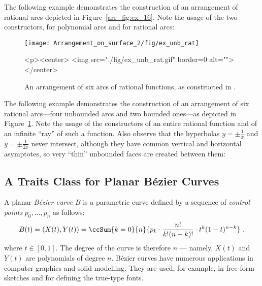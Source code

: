 The following example demonstrates the construction of an
arrangement of rational arcs depicted in
Figure~\ref{arr_fig:ex_16}. Note the usage of the two
constructors, for polynomial arcs and for rational arcs:

\pagebreak[3]


\begin{figure}[h]
\begin{ccTexOnly}
  \begin{center}
  \texttt{[image: Arrangement\_on\_surface\_2/fig/ex\_unb\_rat]}
  \end{center}
\end{ccTexOnly}
\begin{ccHtmlOnly}
  <p><center>
  <img src="./fig/ex_unb_rat.gif" border=0 alt="">
  </center>
\end{ccHtmlOnly}
\caption{An arrangement of six arcs of rational functions, as
constructed in
.\label{arr_fig:ex_unb_rat}}
\end{figure}

The following example demonstrates the construction of an
arrangement of six rational arcs---four unbounded arcs and two
bounded ones---as depicted in Figure~\ref{arr_fig:ex_unb_rat}. Note
the usage of the constructors of an entire rational function and of
an infinite ``ray'' of such a function. Also observe that the hyperbolas
$y = \pm\frac{1}{x}$ and $y = \pm\frac{1}{2x}$ never intersect, although
they have common vertical and horizontal asymptotes, so very ``thin''
unbounded faces are created between them:


\subsection{A Traits Class for Planar B\'ezier Curves\label{arr_ssec:tr_bez}}

A planar {\em B\'ezier curve} $B$ is a parametric curve defined by a sequence
of {\em control points} $p_0, \ldots, p_n$ as follows:
\begin{eqnarray*}
B(t) = \left(X(t), Y(t)\right)
  = \ccSum{k=0}{n}{p_k \cdot \frac{n!}{k! (n-k)!} \cdot
                   t^k (1-t)^{n-k}}\ .
\end{eqnarray*}
where $t \in [0, 1]$. The degree of the curve is therefore $n$ ---
namely, $X(t)$ and $Y(t)$ are polynomials of degree $n$. B\'ezier curves
have numerous applications in computer graphics and solid modelling. They
are used, for example, in free-form sketches and for defining the true-type
fonts.


